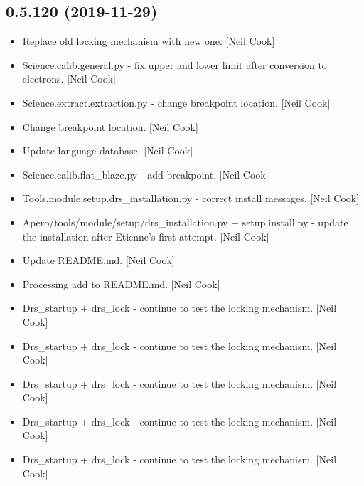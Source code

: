 \documentclass[a4paper,10pt,english]{report}
\begin{document}
\subsection{0.5.120 (2019-11-29)}
\label{\detokenize{misc/changelog:id21}}\begin{itemize}
\item {} 
Replace old locking mechanism with new one. {[}Neil Cook{]}

\item {} 
Science.calib.general.py - fix upper and lower limit after conversion
to electrons. {[}Neil Cook{]}

\item {} 
Science.extract.extraction.py - change breakpoint location. {[}Neil
Cook{]}

\item {} 
Change breakpoint location. {[}Neil Cook{]}

\item {} 
Update language database. {[}Neil Cook{]}

\item {} 
Science.calib.flat\_blaze.py - add breakpoint. {[}Neil Cook{]}

\item {} 
Tools.module.setup.drs\_installation.py - correct install messages.
{[}Neil Cook{]}

\item {} 
Apero/tools/module/setup/drs\_installation.py + setup.install.py -
update the installation after Etienne’s first attempt. {[}Neil Cook{]}

\item {} 
Update README.md. {[}Neil Cook{]}

\item {} 
Processing add to README.md. {[}Neil Cook{]}

\item {} 
Drs\_startup + drs\_lock - continue to test the locking mechanism. {[}Neil
Cook{]}

\item {} 
Drs\_startup + drs\_lock - continue to test the locking mechanism. {[}Neil
Cook{]}

\item {} 
Drs\_startup + drs\_lock - continue to test the locking mechanism. {[}Neil
Cook{]}

\item {} 
Drs\_startup + drs\_lock - continue to test the locking mechanism. {[}Neil
Cook{]}

\item {} 
Drs\_startup + drs\_lock - continue to test the locking mechanism. {[}Neil
Cook{]}


\end{itemize}
\end{document}
